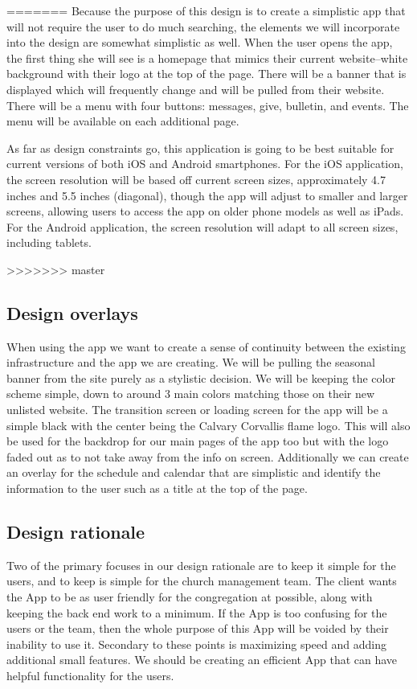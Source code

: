 \documentclass[letterpaper,10pt,draftclsnofoot,onecolumn,titlepage]{IEEEtran}
\begin{document}
=======
			Because the purpose of this design is to create a simplistic app that will not require the user to do much searching, the elements we will incorporate into the design are somewhat simplistic as well.
			When the user opens the app, the first thing she will see is a homepage that mimics their current website--white background with their logo at the top of the page.
			There will be a banner that is displayed which will frequently change and will be pulled from their website.
			There will be a menu with four buttons: messages, give, bulletin, and events.
			The menu will be available on each additional page.

			As far as design constraints go, this application is going to be best suitable for current versions of both iOS and Android smartphones.
			For the iOS application, the screen resolution will be based off current screen sizes, approximately 4.7 inches and 5.5 inches (diagonal), though the app will adjust to smaller and larger screens, allowing users to access the app on older phone models as well as iPads.
			For the Android application, the screen resolution will adapt to all screen sizes, including tablets.

>>>>>>> master
		\subsection{Design overlays}
		When using the app we want to create a sense of continuity between the existing infrastructure and the app we are creating.
		We will be pulling the seasonal banner from the site purely as a stylistic decision.
		We will be keeping the color scheme simple, down to around 3 main colors matching those on their new unlisted website.
		The transition screen or loading screen for the app will be a simple black with the center being the Calvary Corvallis flame logo.
		This will also be used for the backdrop for our main pages of the app too but with the logo faded out as to not take away from the info on screen.
		Additionally we can create an overlay for the schedule and calendar that are simplistic and identify the information to the user such as a title at the top of the page.

		\subsection{Design rationale}
		Two of the primary focuses in our design rationale are to keep it simple for the users, and to keep is simple for the church management team.
		The client wants the \gls{App} to be as user friendly for the congregation at possible, along with keeping the back end work to a minimum.
		If the \gls{App} is too confusing for the users or the team, then the whole purpose of this \gls{App} will be voided by their inability to use it.
		Secondary to these points is maximizing speed and adding additional small features.
		We should be creating an efficient \gls{App} that can have helpful functionality for the users.
\end{document}
